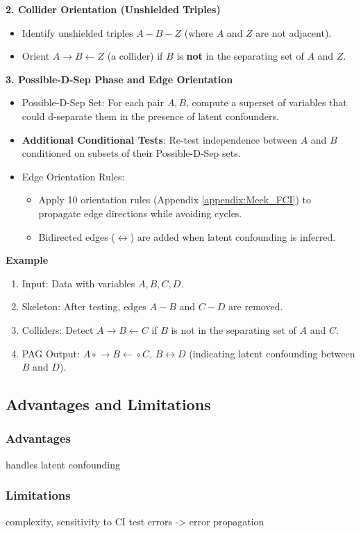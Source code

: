 \documentclass[main.tex]{subfiles}
\begin{document}
\textbf{2. Collider Orientation (Unshielded Triples)}
\begin{itemize}
  \item Identify unshielded triples $A - B - Z$ (where $A$ and $Z$ are not adjacent).
  \item Orient $A \rightarrow B \leftarrow Z$ (a collider) if $B$ is \textbf{not} in the separating set of $A$ and $Z$.
\end{itemize}

\textbf{3. Possible-D-Sep Phase and Edge Orientation}
\begin{itemize}
  \item Possible-D-Sep Set: For each pair $A, B$, compute a superset of variables that could d-separate them in the presence of latent confounders.
  \item \textbf{Additional Conditional Tests}: Re-test independence between $A$ and $B$ conditioned on subsets of their Possible-D-Sep sets.
  \item Edge Orientation Rules:
    \begin{itemize}
      \item Apply 10 orientation rules (Appendix \ref{appendix:Meek_FCI}) to propagate edge directions while avoiding cycles.
      \item Bidirected edges ($\leftrightarrow$) are added when latent confounding is inferred.
    \end{itemize}
\end{itemize}

\textbf{Example}
\begin{enumerate}
  \item Input: Data with variables $A, B, C, D$.
  \item Skeleton: After testing, edges $A - B$ and $C - D$ are removed.
  \item Colliders: Detect $A \rightarrow B \leftarrow C$ if $B$ is not in the separating set of $A$ and $C$.
  \item PAG Output: $A \circ\!\!\rightarrow B \leftarrow\!\!\circ C$, $B \leftrightarrow D$ (indicating latent confounding between $B$ and $D$).
\end{enumerate}



\subsection{Advantages and Limitations}
\subsubsection*{Advantages}
 handles latent confounding
\subsubsection*{Limitations}
complexity, sensitivity to CI test errors -> error propagation

\end{document}
